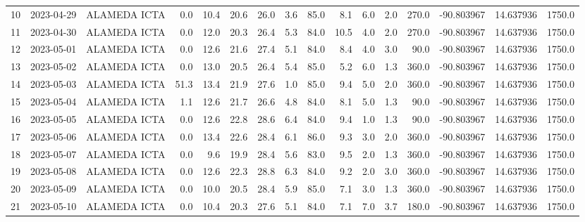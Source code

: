\documentclass[12pt]{article}
\begin{document}
\begin{center}
\begin{tabular}{lllrrrrrrrrrrrrr}
10  & 2023-04-29 &  ALAMEDA ICTA &     0.0 &  10.4 &   20.6 &  26.0 &      3.6 &     85.0 &        8.1 &  6.0 &         2.0 &       270.0 & -90.803967 &  14.637936 &   1750.0 \\
11  & 2023-04-30 &  ALAMEDA ICTA &     0.0 &  12.0 &   20.3 &  26.4 &      5.3 &     84.0 &       10.5 &  4.0 &         2.0 &       270.0 & -90.803967 &  14.637936 &   1750.0 \\
12  & 2023-05-01 &  ALAMEDA ICTA &     0.0 &  12.6 &   21.6 &  27.4 &      5.1 &     84.0 &        8.4 &  4.0 &         3.0 &        90.0 & -90.803967 &  14.637936 &   1750.0 \\
13  & 2023-05-02 &  ALAMEDA ICTA &     0.0 &  13.0 &   20.5 &  26.4 &      5.4 &     85.0 &        5.2 &  6.0 &         1.3 &       360.0 & -90.803967 &  14.637936 &   1750.0 \\
14  & 2023-05-03 &  ALAMEDA ICTA &    51.3 &  13.4 &   21.9 &  27.6 &      1.0 &     85.0 &        9.4 &  5.0 &         2.0 &       360.0 & -90.803967 &  14.637936 &   1750.0 \\
15  & 2023-05-04 &  ALAMEDA ICTA &     1.1 &  12.6 &   21.7 &  26.6 &      4.8 &     84.0 &        8.1 &  5.0 &         1.3 &        90.0 & -90.803967 &  14.637936 &   1750.0 \\
16  & 2023-05-05 &  ALAMEDA ICTA &     0.0 &  12.6 &   22.8 &  28.6 &      6.4 &     84.0 &        9.4 &  1.0 &         1.3 &        90.0 & -90.803967 &  14.637936 &   1750.0 \\
17  & 2023-05-06 &  ALAMEDA ICTA &     0.0 &  13.4 &   22.6 &  28.4 &      6.1 &     86.0 &        9.3 &  3.0 &         2.0 &       360.0 & -90.803967 &  14.637936 &   1750.0 \\
18  & 2023-05-07 &  ALAMEDA ICTA &     0.0 &   9.6 &   19.9 &  28.4 &      5.6 &     83.0 &        9.5 &  2.0 &         1.3 &       360.0 & -90.803967 &  14.637936 &   1750.0 \\
19  & 2023-05-08 &  ALAMEDA ICTA &     0.0 &  12.6 &   22.3 &  28.8 &      6.3 &     84.0 &        9.2 &  2.0 &         3.0 &       360.0 & -90.803967 &  14.637936 &   1750.0 \\
20  & 2023-05-09 &  ALAMEDA ICTA &     0.0 &  10.0 &   20.5 &  28.4 &      5.9 &     85.0 &        7.1 &  3.0 &         1.3 &       360.0 & -90.803967 &  14.637936 &   1750.0 \\
21  & 2023-05-10 &  ALAMEDA ICTA &     0.0 &  10.4 &   20.3 &  27.6 &      5.1 &     84.0 &        7.1 &  7.0 &         3.7 &       180.0 & -90.803967 &  14.637936 &   1750.0 \\

\end{tabular}
\end{center}
\end{document}
